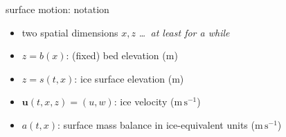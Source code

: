 \documentclass[10pt,dvipsnames]{beamer}
\newcommand{\bu}{\mathbf{u}}
\begin{document}
\begin{frame}{surface motion: notation}
\begin{center}
\end{center}

\vspace{-3mm}
\begin{itemize}
\item two spatial dimensions $x,z$ \hfill \emph{\dots\, at least for a while}
\item $z = b(x)$: (fixed) bed elevation (m)
\item $z = s(t,x)$: ice surface elevation (m)
\item $\bu(t,x,z)=(u,w)$: ice velocity ($\text{m}\,\text{s}^{-1}$)
\item $a(t,x)$: surface mass balance in ice-equivalent units ($\text{m}\,\text{s}^{-1}$)
\end{itemize}
\end{frame}
\end{document}
